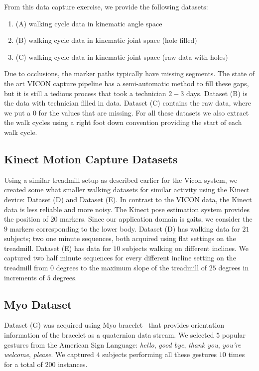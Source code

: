 \documentclass[jou,apacite]{apa6}
\begin{document}
From this data capture exercise, we provide the following datasets:
\begin{enumerate}
\item (A) walking cycle data in kinematic angle space
\item (B) walking cycle data in kinematic joint space (hole filled)
\item (C) walking cycle data in kinematic joint space (raw data with holes)
\end{enumerate}

Due to occlusions, the marker paths typically have missing segments. The state of the art VICON capture pipeline has a semi-automatic method to fill these gaps, but it is still a tedious process that took a technician $2-3$ days. Dataset (B) is the data with technician filled in data. Dataset (C) contains the raw data, where we put a $0$ for the values that are missing. 
For all these datasets we also extract the walk cycles using a right foot down convention providing the start of each walk cycle.

\subsection{Kinect Motion Capture Datasets}
Using a similar treadmill setup as described earlier for the Vicon system, we created some what smaller walking datasets for similar activity using the Kinect device: Dataset (D) and Dataset (E). 
In contrast to the VICON data, the Kinect data is less reliable and more noisy.
The Kinect pose estimation system provides the position of $20$ markers.
Since our application domain is gaits, we consider the $9$ markers corresponding to the lower body.
Dataset (D) has walking data for $21$ subjects; two one minute sequences, both acquired using flat settings on the treadmill.
Dataset (E) has data for $10$ subjects walking on different inclines. 
We captured two half minute sequences for every different incline setting on the treadmill from $0$ degrees to the maximum slope of the treadmill of $25$ degrees in increments of $5$ degrees.

\subsection{Myo Dataset}
Dataset (G) was acquired using Myo bracelet~\cite{Myo} that provides orientation information of the bracelet as a quaternion data stream.
We selected $5$ popular gestures from the American Sign Language: \textit{hello}, \textit{good bye}, \textit{thank you}, \textit{you're welcome}, \textit{please}.
We captured $4$ subjects performing all these gestures $10$ times for a total of $200$ instances.
\end{document}
